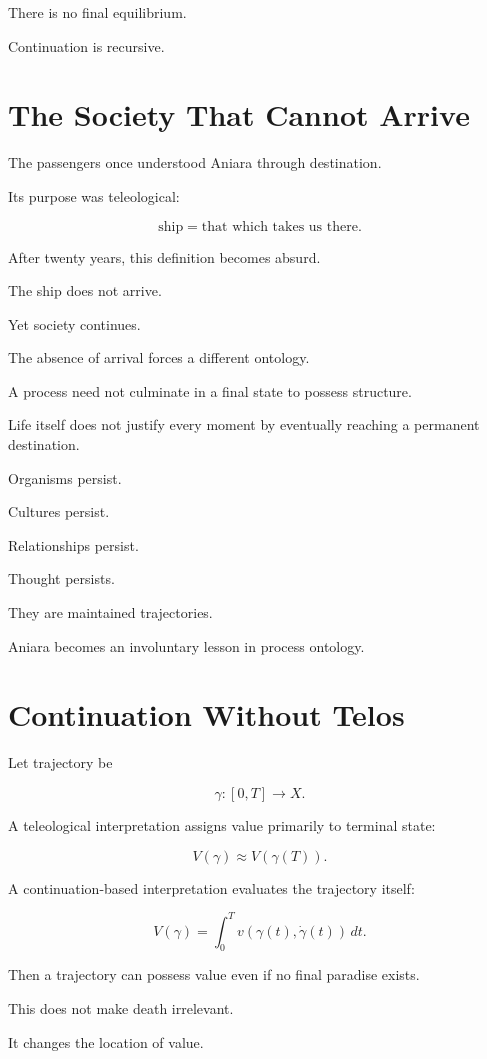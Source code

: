 \documentclass[11pt,oneside]{book}
\theoremstyle{definition}
\theoremstyle{remark}
\begin{document}
There is no final equilibrium.

Continuation is recursive.

\section{The Society That Cannot Arrive}

The passengers once understood Aniara through destination.

Its purpose was teleological:

\[
\text{ship}
=
\text{that which takes us there}.
\]

After twenty years, this definition becomes absurd.

The ship does not arrive.

Yet society continues.

The absence of arrival forces a different ontology.

A process need not culminate in a final state to possess structure.

Life itself does not justify every moment by eventually reaching a permanent destination.

Organisms persist.

Cultures persist.

Relationships persist.

Thought persists.

They are maintained trajectories.

Aniara becomes an involuntary lesson in process ontology.

\section{Continuation Without Telos}

Let trajectory be

\[
\gamma:[0,T]\rightarrow X.
\]

A teleological interpretation assigns value primarily to terminal state:

\[
V(\gamma)
\approx
V(\gamma(T)).
\]

A continuation-based interpretation evaluates the trajectory itself:

\[
V(\gamma)
=
\int_0^T
v(\gamma(t),\dot{\gamma}(t))\,dt.
\]

Then a trajectory can possess value even if no final paradise exists.

This does not make death irrelevant.

It changes the location of value.
\end{document}
